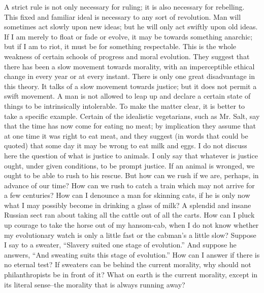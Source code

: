 \documentclass{book}
\begin{document}
A strict rule is not only necessary for ruling; it is also necessary for rebelling. This fixed and familiar ideal is necessary to any sort of revolution. Man will sometimes act slowly upon new ideas; but he will only act swiftly upon old ideas. If I am merely to float or fade or evolve, it may be towards something anarchic; but if I am to riot, it must be for something respectable. This is the whole weakness of certain schools of progress and moral evolution. They suggest that there has been a slow movement towards morality, with an imperceptible ethical change in every year or at every instant. There is only one great disadvantage in this theory. It talks of a slow movement towards justice; but it does not permit a swift movement. A man is not allowed to leap up and declare a certain state of things to be intrinsically intolerable. To make the matter clear, it is better to take a specific example. Certain of the idealistic vegetarians, such as Mr. Salt, say that the time has now come for eating no meat; by implication they assume that at one time it was right to eat meat, and they suggest (in words that could be quoted) that some day it may be wrong to eat milk and eggs. I do not discuss here the question of what is justice to animals. I only say that whatever is justice ought, under given conditions, to be prompt justice. If an animal is wronged, we ought to be able to rush to his rescue. But how can we rush if we are, perhaps, in advance of our time? How can we rush to catch a train which may not arrive for a few centuries? How can I denounce a man for skinning cats, if he is only now what I may possibly become in drinking a glass of milk? A splendid and insane Russian sect ran about taking all the cattle out of all the carts. How can I pluck up courage to take the horse out of my hansom-cab, when I do not know whether my evolutionary watch is only a little fast or the cabman’s a little slow? Suppose I say to a sweater, “Slavery suited one stage of evolution.” And suppose he answers, “And sweating suits this stage of evolution.” How can I answer if there is no eternal test? If sweaters can be behind the current morality, why should not philanthropists be in front of it? What on earth is the current morality, except in its literal sense–the morality that is always running away?
\end{document}
